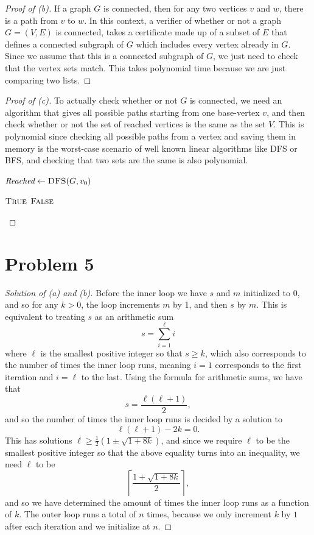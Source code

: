\documentclass[11pt,a4paper]{article}
\begin{document}
\begin{proof}[Proof of (b)]
If a graph $G$ is connected, then for any two vertices $v$ and $w$, there is a path from $v$ to $w$. In this context, a verifier of whether or not a graph $G = (V,E)$ is connected, takes a certificate made up of a subset of $E$ that defines a connected subgraph of $G$ which includes every vertex already in $G$. Since we assume that this is a connected subgraph of $G$, we just need to check that the vertex sets match. This takes polynomial time because we are just comparing two lists.
\end{proof}

\begin{proof}[Proof of (c)]
To actually check whether or not $G$ is connected, we need an algorithm that gives all possible paths starting from one base-vertex $v$, and then check whether or not the set of reached vertices is the same as the set $V$.
This is polynomial since checking all possible paths from a vertex and saving them in memory is the worst-case scenario of well known linear algorithms like DFS or BFS, and checking that two sets are the same is also polynomial.

\begin{algorithm}
\caption{\textsc{CheckVertices}$(G, v_{0})$}
\label{alg:reachability}
\begin{algorithmic}[1]
\State $\textit{Reached} \gets \textsc{DFS}(G,v_0)$

    \State \Return $\textsc{True}$
\Else
    \State \Return $\textsc{False}$
\EndIf

\end{algorithmic}
\end{algorithm}
\end{proof}

\section*{Problem 5}
\begin{proof}[Solution of (a) and (b)]
 Before the inner loop we have $s$ and $m$ initialized to $0$, and so for any $k>0$,
the loop increments $m$ by 1, and then $s$ by $m$. This is equivalent to treating $s$ as an arithmetic sum \[
s = \sum_{i=1}^{\ell} i
\] where $\ell$ is the smallest positive integer so that $s \geq k$, which also corresponds to the number of times the inner loop runs, meaning $i= 1$ corresponds to the first iteration and $i = \ell$ to the last. 
Using the formula for arithmetic sums, we have that \[
s = \frac{\ell(\ell + 1)}{2},
\] and so the number of times the inner loop runs is decided by a solution to 
\[
\ell(\ell +1) - 2k = 0.
\] This has solutions $\ell \geq \frac{1}{2}(1 \pm \sqrt{1 + 8k})$, and since we require $\ell$ to be the smallest positive integer so that the above equality turns into an inequality, we need $\ell$ to be 
$$
\left\lceil \frac{1 + \sqrt{1 + 8k} }{2} \right\rceil,
$$ and so we have determined the amount of times the inner loop runs as a function of $k$. 
The outer loop runs a total of $n$ times, because we only increment $k$ by $1$ after each iteration and we initialize at $n$. 
\end{proof}
\end{document}
